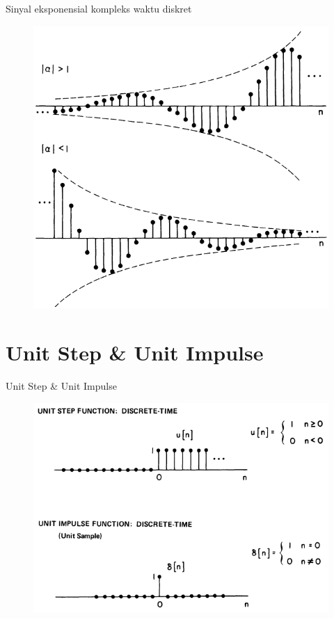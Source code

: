 \documentclass[pdflatex,compress,mathserif]{beamer}
\begin{document}
\begin{frame}{Sinyal eksponensial kompleks waktu diskret}
	\begin{figure}
		\centering
		\includegraphics[height=0.8\textheight]{img/01.slide_19}
	\end{figure}
\end{frame}

\section{Unit Step \& Unit Impulse}
\begin{frame}{Unit Step \& Unit Impulse}
	\begin{figure}
		\centering
		\includegraphics[height=0.8\textheight]{img/02.slide_01}
	\end{figure}
\end{frame}
\end{document}
